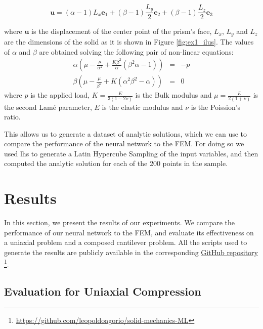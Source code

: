 \documentclass[oneside,a4paper,english,links]{amca}
\begin{document}
\begin{equation}
\label{eq:analytic_solution}
\boldsymbol{u} = 
(\alpha - 1)L_x \boldsymbol{e}_1 
+   
(\beta - 1) \frac{L_y}{2}  \boldsymbol{e}_2 
+   
(\beta - 1)\frac{L_z}{2} \boldsymbol{e}_3 
\end{equation}

where $\boldsymbol{u}$ is the displacement of the center point of the prism's face, $L_x$, $L_y$ and $L_z$ are the dimensions of the solid as it is shown in Figure \ref{fig:ex1_ilus}. The values of $\alpha$ and $\beta$ are obtained solving the following pair of non-linear equations:
%
\begin{eqnarray}
\alpha \left( 
\mu -  \frac{\mu}{\alpha^2} + \frac{K\beta^2}{\alpha} (\beta^2 \alpha -1)  
\right) &=& - p \\
\beta \left( 
	\mu -  \frac{\mu}{\beta^2} + K (\alpha^2\beta^2 - \alpha) 
 \right) &=& 0
\end{eqnarray}
%
where  $p$ is the applied load, $K = \frac{E}{3(1 - 2\nu)}$ is the Bulk modulus and $\mu = \frac{E}{2(1 + \nu)}$ is the second Lamé parameter, $E$ is the elastic modulus and $\nu$ is the Poission's ratio. 



This allows us to generate a dataset of analytic solutions, which we can use to compare the performance of the neural network to the FEM. For doing so we used lhs to generate a Latin Hypercube Sampling of the input variables, and then computed the analytic solution for each of the 200 points in the sample.


\section{Results}
In this section, we present the results of our experiments. We compare the performance of our neural network to the FEM, and evaluate its effectiveness on a uniaxial problem and a composed cantilever problem. All the scripts used to generate the results are publicly available in the corresponding \href{https://github.com/leopoldoagorio/solid-mechanics-ML}{ GitHub repository} \footnote{\href{https://github.com/leopoldoagorio/solid-mechanics-ML}{ https://github.com/leopoldoagorio/solid-mechanics-ML} }.

\subsection{Evaluation for Uniaxial Compression}
\end{document}
